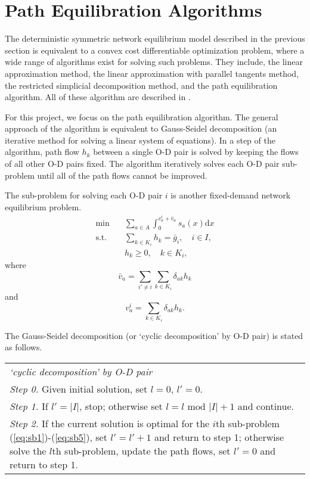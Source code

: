 \section{Path Equilibration Algorithms}
The deterministic symmetric network equilibrium model described in the previous section is equivalent to a convex cost differentiable optimization problem,
where a wide range of algorithms exist for solving such problems.
They include, the linear approximation method,
the linear approximation with parallel tangents method,
the restricted simplicial decomposition method,
and the path equilibration algorithm.
All of these algorithm are described in \citet{Florian}.

For this project,
we focus on the path equilibration algorithm.
The general approach of the algorithm is equivalent to
Gauss-Seidel decomposition (an iterative method for solving a linear system of equations).
In a step of the algorithm,
path flow $h_k$ between a single O-D pair is solved by keeping the flows of all other O-D pairs fixed.
The algorithm iteratively solves each O-D pair sub-problem until all of the path flows cannot be improved.

The sub-problem for solving each O-D pair $i$ is another fixed-demand network equilibrium problem.
\begin{align} \label{eq:sb1}
    \min & \quad \sum_{a \in A} \int_0^{v_a^i + \bar{v}_a} s_a(x) \mathrm{d} x \\
    \text{s.t.} &\quad \sum_{k \in K_i} h_k = \bar{g}_i, \quad i \in I, \\
    & \quad h_k \geq 0, \quad k \in K_i,
\end{align}
where 
\begin{equation}
    \bar{v}_a = \sum_{i' \neq i} \sum_{k \in K_i} \delta_{ak} h_k
\end{equation}
and
\begin{equation} \label{eq:sb5}
    v_a^i = \sum_{k \in K_i} \delta_{ak} h_k.
\end{equation}

The Gauss-Seidel decomposition (or `cyclic decomposition' by O-D pair) is stated as follows.

\begin{table}[H]
    \begin{tabular}{ m{} }
        \hspace{-.5cm}\emph{`cyclic decomposition' by O-D pair} \\
        \emph{Step 0.} Given initial solution, set $l = 0$, $l' = 0$.\\
        \emph{Step 1.} If $l' = |I|$, stop; otherwise set $l = l \text{ mod } |I| + 1$ and continue.\\
        \emph{Step 2.} If the current solution is optimal for the $i$th sub-problem (\ref{eq:sb1})-(\ref{eq:sb5}), set $l' = l' + 1$ and return to step 1; otherwise solve the $l$th sub-problem, update the path flows, set $l' = 0$ and return to step 1.\\
    \end{tabular}
\end{table}

